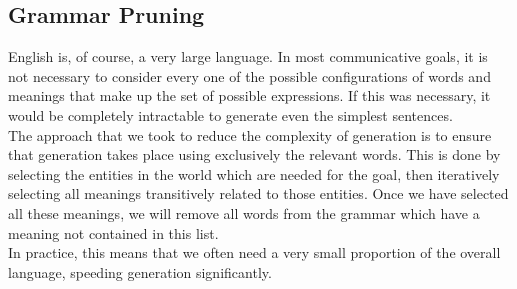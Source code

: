 \subsection{Grammar Pruning}

English is, of course, a very large language.  In most communicative goals, it is
not necessary to consider every one of the possible configurations of words and
meanings that make up the set of possible expressions.  If this was necessary,
it would be completely intractable to generate even the simplest sentences.\\

The approach that we took to reduce the complexity of generation is to ensure that
generation takes place using exclusively the relevant words.  This is done by selecting
the entities in the world which are needed for the goal, then iteratively selecting all
meanings transitively related to those entities.  Once we have selected all these meanings,
we will remove all words from the grammar which have a meaning not contained in this list.\\

In practice, this means that we often need a very small proportion of the overall language,
speeding generation significantly.